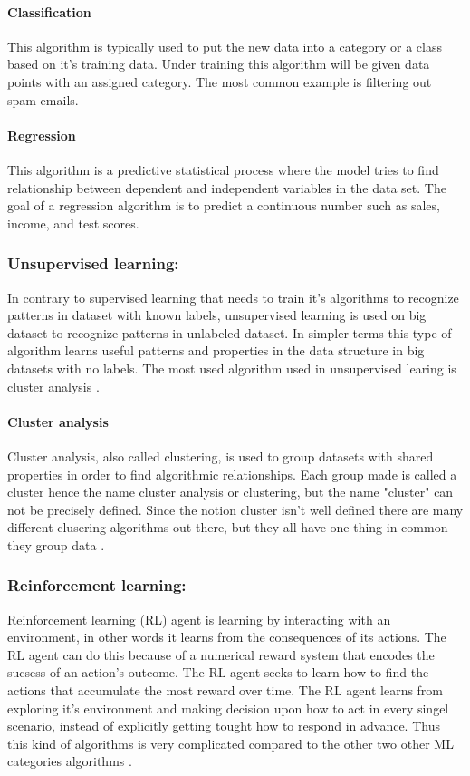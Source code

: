 \documentclass[conference]{IEEEtran}
\begin{document}
			\paragraph{Classification}
			This algorithm is typically used to put the new data into a category or a class based on it's training data. Under training this algorithm
			will be given data points with an assigned category. The most common example is filtering out spam emails.
			
			\paragraph{Regression}
			This algorithm is a predictive statistical process where the model tries to find relationship between dependent and independent variables
			in the data set. The goal of a regression algorithm is to predict a continuous number such as sales, income, and test scores.
		       

		\subsubsection{Unsupervised learning:}
			In contrary to supervised learning that needs to train it's algorithms to recognize patterns in dataset with known labels, unsupervised learning
			is used on big dataset to recognize patterns in unlabeled dataset. In simpler terms this type of algorithm learns useful patterns and properties in
			the data structure in big datasets with no labels. The most used algorithm used in unsupervised learing is cluster analysis \cite{deepAI:UL} \cite{Wiki:UL}.

			\paragraph{Cluster analysis}
			Cluster analysis, also called clustering, is used to group datasets with shared properties in order to find algorithmic relationships. Each group made is
			called a cluster hence the name cluster analysis or clustering, but the name "cluster" can not be precisely defined. Since the notion cluster isn't well defined
			there are many different clusering algorithms out there, but they all have one thing in common they group data \cite{Wiki:CA}.

		\subsubsection{Reinforcement learning:}
			Reinforcement learning (RL) agent is learning by interacting with an environment, in other words it learns from the consequences of its actions. The RL agent can
			do this because of a numerical reward system that encodes the sucsess of an action's outcome. The RL agent seeks to learn how to find the actions that accumulate the
			most reward over time. The RL agent learns from exploring it's environment and making decision upon how to act in every singel scenario, instead of explicitly getting tought
			how to respond in advance. Thus this kind of algorithms is very complicated compared to the other two other ML categories algorithms \cite{Scholar:RL}.
	
\end{document}
